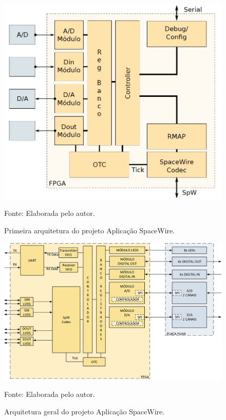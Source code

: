 \begin{figure}[!htb]
	\centering
	\caption{Primeira arquitetura do projeto Aplicação SpaceWire.}
	\includegraphics[scale = 0.5]{Imagens/Arch_1.png}
	
	Fonte: Elaborada pelo autor.
	
	\label{Arch_1}
\end{figure}

\begin{figure}[!htb]
	\centering
	\caption{Arquitetura geral do projeto Aplicação SpaceWire.}
	\includegraphics[scale = 1.85]{Imagens/Arch_ApSpW}
	
	Fonte: Elaborada pelo autor.
	
	\label{Arch_ApSpW}
\end{figure}

